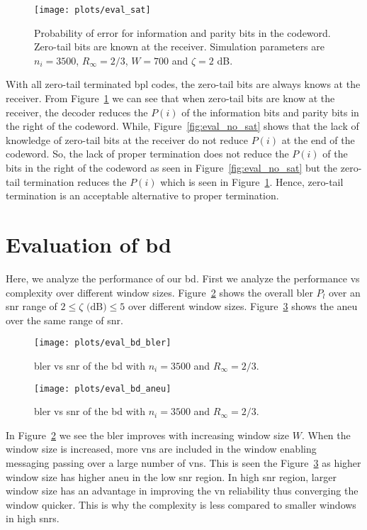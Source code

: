 \begin{figure}[htbp]
  \centering
  \texttt{[image: plots/eval\_sat]}
  \caption{Probability of error for information and parity bits in the codeword. Zero-tail bits are known at the receiver. Simulation parameters are $n_i=3500$, $R_\infty=2/3$, $W=700$ and $\zeta=2$ dB.}
  \label{fig:eval_sat}
\end{figure}

With all zero-tail terminated \ac{bpl} codes, the zero-tail bits are always knows at the receiver. 
From Figure~\ref{fig:eval_sat} we can see that when zero-tail bits are know at the receiver, the decoder reduces the $P(i)$ of the information bits and parity bits in the right of the codeword. While, Figure~\ref{fig:eval_no_sat} shows that the lack of knowledge of zero-tail bits at the receiver do not reduce $P(i)$ at the end of the codeword. So, the lack of proper termination does not reduce the $P(i)$ of the bits in the right of the codeword as seen in Figure~\ref{fig:eval_no_sat} but the zero-tail termination reduces the $P(i)$ which is seen in Figure~\ref{fig:eval_sat}. Hence, zero-tail termination is an acceptable alternative to proper termination.
 
\section{Evaluation of \acl{bd}}
Here, we analyze the performance of our \ac{bd}. First we analyze the performance vs complexity over different window sizes. Figure~\ref{fig:eval_bd_bler} shows the overall \ac{bler} $P_l$ over an \ac{snr} range of $2\leq\zeta\text{ (dB)}\leq 5$ over different window sizes. Figure~\ref{fig:eval_bd_aneu} shows the \ac{aneu} over the same range of \ac{snr}.
\begin{figure}[htbp]
  \centering
  \texttt{[image: plots/eval\_bd\_bler]}
  \caption{\ac{bler} vs \ac{snr} of the \acl{bd} with $n_i=3500$ and $R_\infty=2/3$.}
  \label{fig:eval_bd_bler}
\end{figure}
\begin{figure}[htbp]
   \centering
  \texttt{[image: plots/eval\_bd\_aneu]}
  \caption{\ac{bler} vs \ac{snr} of the \acl{bd} with $n_i=3500$ and $R_\infty=2/3$.}
  \label{fig:eval_bd_aneu}
\end{figure}

In Figure~\ref{fig:eval_bd_bler} we see the \ac{bler} improves with increasing window size $W$. When the window size is increased, more \acp{vn} are included in the window enabling messaging passing over a large number of \acp{vn}. This is seen the Figure~\ref{fig:eval_bd_aneu} as higher window size has higher \ac{aneu} in the low \ac{snr} region. In high \ac{snr} region, larger window size has an advantage in improving the \ac{vn} reliability thus converging the window quicker. This is why the complexity is less compared to smaller windows in high \acp{snr}.

